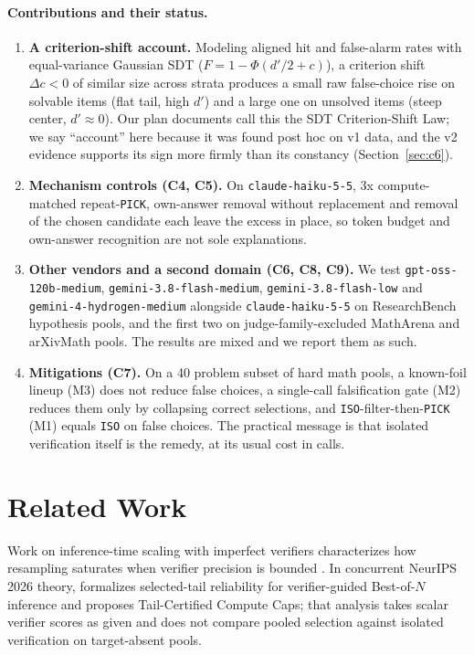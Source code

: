 \documentclass[10pt,twocolumn]{article}
\begin{document}
\paragraph{Contributions and their status.}
\begin{enumerate}\setlength{\itemsep}{2pt}
\item \textbf{A criterion-shift account.} Modeling aligned hit and false-alarm rates with equal-variance Gaussian SDT ($F = 1 - \Phi(d'/2 + c)$), a criterion shift $\Delta c < 0$ of similar size across strata produces a small raw false-choice rise on solvable items (flat tail, high $d'$) and a large one on unsolved items (steep center, $d' \approx 0$). Our plan documents call this the SDT Criterion-Shift Law; we say ``account'' here because it was found post hoc on v1 data, and the v2 evidence supports its sign more firmly than its constancy (Section~\ref{sec:c6}).
\item \textbf{Mechanism controls (C4, C5).} On \texttt{claude-haiku-5-5}, 3x compute-matched repeat-\texttt{PICK}, own-answer removal without replacement and removal of the chosen candidate each leave the excess in place, so token budget and own-answer recognition are not sole explanations.
\item \textbf{Other vendors and a second domain (C6, C8, C9).} We test \texttt{gpt-oss-120b-medium}, \texttt{gemini-3.8-flash-medium}, \texttt{gemini-3.8-flash-low} and \texttt{gemini-4-hydrogen-medium} alongside \texttt{claude-haiku-5-5} on ResearchBench hypothesis pools, and the first two on judge-family-excluded MathArena and arXivMath pools. The results are mixed and we report them as such.
\item \textbf{Mitigations (C7).} On a 40 problem subset of hard math pools, a known-foil lineup (M3) does not reduce false choices, a single-call falsification gate (M2) reduces them only by collapsing correct selections, and \texttt{ISO}-filter-then-\texttt{PICK} (M1) equals \texttt{ISO} on false choices. The practical message is that isolated verification itself is the remedy, at its usual cost in calls.
\end{enumerate}

\section{Related Work}
Work on inference-time scaling with imperfect verifiers characterizes how resampling saturates when verifier precision is bounded \citep{stroebl2026limits}. In concurrent NeurIPS 2026 theory, \citet{zhang2026selected} formalizes selected-tail reliability for verifier-guided Best-of-$N$ inference and proposes Tail-Certified Compute Caps; that analysis takes scalar verifier scores as given and does not compare pooled selection against isolated verification on target-absent pools.
\end{document}
